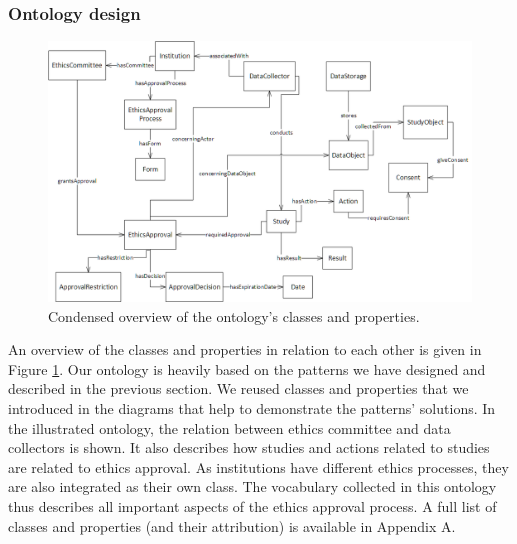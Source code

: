 \documentclass[10pt]{article}
\begin{document}
\subsubsection{Ontology design}
\begin{figure}
\centering
	\includegraphics[width=1\textwidth]{img/ontology.png}
	\caption{Condensed overview of the ontology's classes and properties.}
	\label{ontology}
\end{figure}

An overview of the classes and properties in relation to each other is given in Figure \ref{ontology}. Our ontology is heavily based on the patterns we have designed and described in the previous section. We reused classes and properties that we introduced in the diagrams that help to demonstrate the patterns' solutions. In the illustrated ontology, the relation between ethics committee and data collectors is shown. It also describes how studies and actions related to studies are related to ethics approval. As institutions have different ethics processes, they are also integrated as their own class. The vocabulary collected in this ontology thus describes all important aspects of the ethics approval process. A full list of classes and properties (and their attribution) is available in Appendix A.
\end{document}
